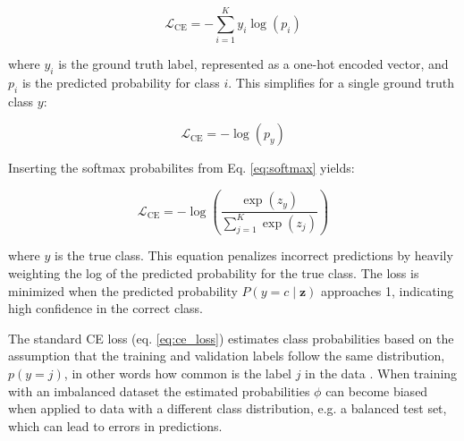 \begin{equation}
    \label{eq:ce_multi}
    \mathcal{L}_{\text{CE}} = -\sum_{i=1}^{K} y_i \log(p_i)
\end{equation}

\noindent where $y_i$ is the ground truth label, represented as a one-hot encoded vector, and $p_i$ is the predicted probability for class $i$. This simplifies for a single ground truth class $y$:

\begin{equation}
    \label{eq:ce_single}
    \mathcal{L}_{\text{CE}} = - \log(p_y)
\end{equation}

\noindent Inserting the softmax probabilites from Eq. \eqref{eq:softmax} yields:

\begin{equation}
    \label{eq:ce_loss}
    \mathcal{L}_{\text{CE}} = - \log\left(\frac{\exp(z_y)}{\sum_{j=1}^{K} \exp(z_j)}\right)
\end{equation}

\noindent where $y$ is the true class. This equation penalizes incorrect predictions by heavily weighting the log of the predicted probability for the true class. The loss is minimized when the predicted probability \( P(y = c \mid \mathbf{z}) \) approaches 1, indicating high confidence in the correct class.

The standard CE loss (eq. \eqref{eq:ce_loss}) estimates class probabilities based on the assumption that the training and validation labels follow the same distribution, $p(y=j)$, in other words how common is the label $j$ in the data \cite{ren2020balancedmetasoftmaxlongtailedvisual}. When training with an imbalanced dataset the estimated probabilities $\phi$ can become biased when applied to data with a different class distribution, e.g. a balanced test set, which can lead to errors in predictions.


